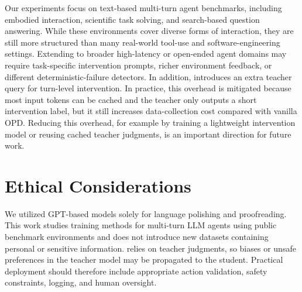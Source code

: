 Our experiments focus on text-based multi-turn agent benchmarks, including embodied interaction, scientific task solving, and search-based question answering.
%
While these environments cover diverse forms of interaction, they are still more structured than many real-world tool-use and software-engineering settings.
%
Extending \ours{} to broader high-latency or open-ended agent domains may require task-specific intervention prompts, richer environment feedback, or different deterministic-failure detectors.
%
In addition, \ours{} introduces an extra teacher query for turn-level intervention.
%
In practice, this overhead is mitigated because most input tokens can be cached and the teacher only outputs a short intervention label, but it still increases data-collection cost compared with vanilla OPD.
%
Reducing this overhead, for example by training a lightweight intervention model or reusing cached teacher judgments, is an important direction for future work.

\section{Ethical Considerations}
We utilized GPT-based models \citep{openai2023gpt4} solely for language polishing and proofreading.
%
This work studies training methods for multi-turn LLM agents using public benchmark environments and does not introduce new datasets containing personal or sensitive information.
%
\ours{} relies on teacher judgments, so biases or unsafe preferences in the teacher model may be propagated to the student.
%
Practical deployment should therefore include appropriate action validation, safety constraints, logging, and human oversight.

